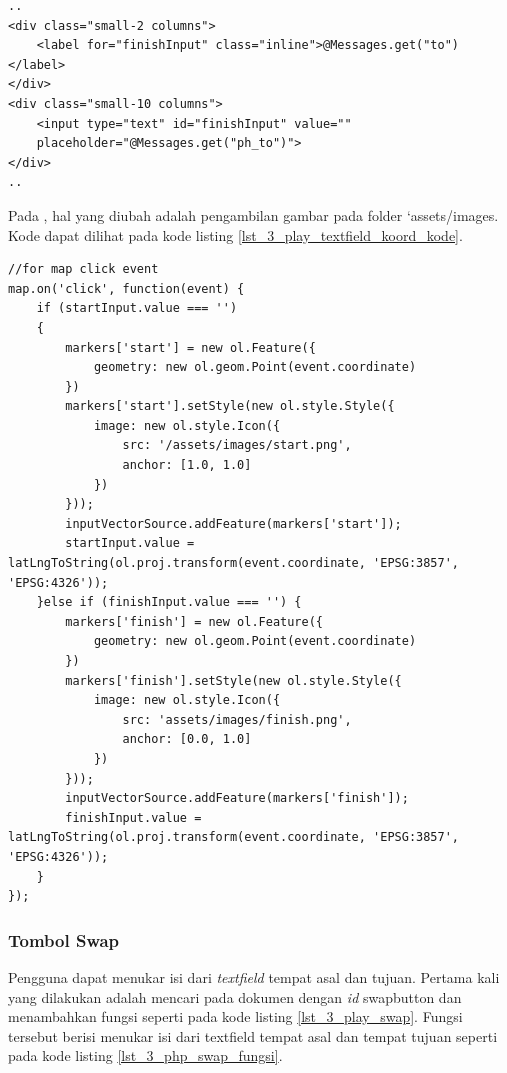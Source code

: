 \begin{lstlisting}[caption=Menampilkan \textit{textfield} tempat tujuan kepada pengguna ,label = {lst_3_play_textfield_to}]
..
<div class="small-2 columns">
    <label for="finishInput" class="inline">@Messages.get("to")</label>
</div>
<div class="small-10 columns">
    <input type="text" id="finishInput" value=""
    placeholder="@Messages.get("ph_to")">
</div>
..
\end{lstlisting}
	
Pada \play, hal yang diubah adalah pengambilan gambar pada folder `assets/images. Kode dapat dilihat pada kode listing \ref{lst_3_play_textfield_koord_kode}.
	
	\begin{lstlisting}[caption=Membuat \textit{event} klik pada peta,label = {lst_3_play_textfield_koord_kode}]
//for map click event
map.on('click', function(event) {
    if (startInput.value === '')
    {
        markers['start'] = new ol.Feature({
            geometry: new ol.geom.Point(event.coordinate)
        })
        markers['start'].setStyle(new ol.style.Style({
            image: new ol.style.Icon({
                src: '/assets/images/start.png',
                anchor: [1.0, 1.0]
            })
        }));
        inputVectorSource.addFeature(markers['start']);
        startInput.value = latLngToString(ol.proj.transform(event.coordinate, 'EPSG:3857', 'EPSG:4326'));
    }else if (finishInput.value === '') {
        markers['finish'] = new ol.Feature({
            geometry: new ol.geom.Point(event.coordinate)
        })
        markers['finish'].setStyle(new ol.style.Style({
            image: new ol.style.Icon({
                src: 'assets/images/finish.png',
                anchor: [0.0, 1.0]
            })
        }));
        inputVectorSource.addFeature(markers['finish']);
        finishInput.value = latLngToString(ol.proj.transform(event.coordinate, 'EPSG:3857', 'EPSG:4326'));
    }
});

\end{lstlisting}

\subsubsection{Tombol Swap}
Pengguna dapat menukar isi dari \textit{textfield} tempat asal dan tujuan. Pertama kali yang dilakukan adalah mencari pada dokumen dengan \textit{id} swapbutton dan menambahkan fungsi seperti pada kode listing \ref{lst_3_play_swap}. Fungsi tersebut berisi menukar isi dari textfield tempat asal dan tempat tujuan seperti pada kode listing \ref{lst_3_php_swap_fungsi}.

